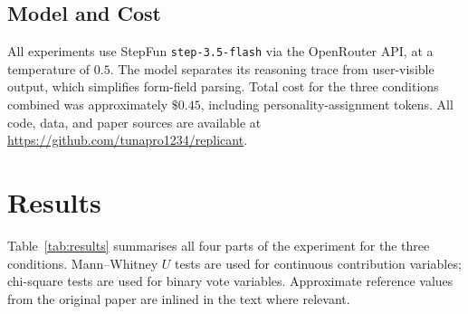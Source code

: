 \documentclass[12pt, a4paper]{article}
\begin{document}
\subsection{Model and Cost}

All experiments use StepFun \texttt{step-3.5-flash} via the OpenRouter API, at a temperature of $0.5$. The model separates its reasoning trace from user-visible output, which simplifies form-field parsing. Total cost for the three conditions combined was approximately $\$0.45$, including personality-assignment tokens. All code, data, and paper sources are available at \url{https://github.com/tunapro1234/replicant}.

\section{Results}

Table~\ref{tab:results} summarises all four parts of the experiment for the three conditions. Mann--Whitney $U$ tests are used for continuous contribution variables; chi-square tests are used for binary vote variables. Approximate reference values from the original paper are inlined in the text where relevant.
\end{document}
